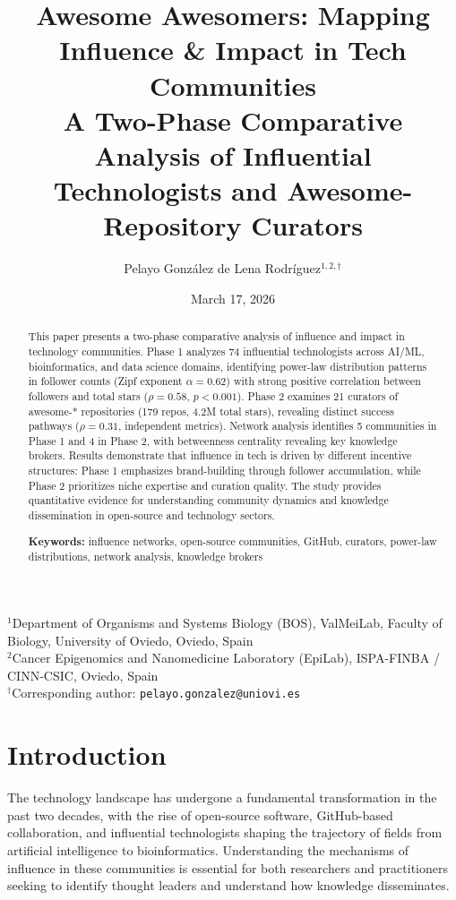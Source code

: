 \documentclass[11pt]{article}
\title{Awesome Awesomers: Mapping Influence \& Impact in Tech Communities\\
{\large A Two-Phase Comparative Analysis of Influential Technologists and Awesome-Repository Curators}}
\author{
    Pelayo González de Lena Rodríguez$^{1,2,\dagger}$
}
\date{March 17, 2026}
\makeatletter
\newcommand{\affiliations}{%
    $^{1}$Department of Organisms and Systems Biology (BOS), ValMeiLab, Faculty of Biology, University of Oviedo, Oviedo, Spain\\
    $^{2}$Cancer Epigenomics and Nanomedicine Laboratory (EpiLab), ISPA-FINBA / CINN-CSIC, Oviedo, Spain\\
    $^{\dagger}$Corresponding author: \texttt{pelayo.gonzalez@uniovi.es}
}
\makeatother
\begin{document}
\maketitle

\vspace{0.5cm}
\begin{center}
\small
\affiliations
\end{center}

\vspace{1cm}

\begin{abstract}
This paper presents a two-phase comparative analysis of influence and impact in technology communities. Phase 1 analyzes 74 influential technologists across AI/ML, bioinformatics, and data science domains, identifying power-law distribution patterns in follower counts (Zipf exponent $\alpha = 0.62$) with strong positive correlation between followers and total stars ($\rho = 0.58$, $p < 0.001$). Phase 2 examines 21 curators of awesome-* repositories (179 repos, 4.2M total stars), revealing distinct success pathways ($\rho = 0.31$, independent metrics). Network analysis identifies 5 communities in Phase 1 and 4 in Phase 2, with betweenness centrality revealing key knowledge brokers. Results demonstrate that influence in tech is driven by different incentive structures: Phase 1 emphasizes brand-building through follower accumulation, while Phase 2 prioritizes niche expertise and curation quality. The study provides quantitative evidence for understanding community dynamics and knowledge dissemination in open-source and technology sectors.

\vspace{0.5cm}
\noindent
\textbf{Keywords:} influence networks, open-source communities, GitHub, curators, power-law distributions, network analysis, knowledge brokers

\end{abstract}

\newpage
\tableofcontents
\newpage


\section{Introduction}

The technology landscape has undergone a fundamental transformation in the past two decades, with the rise of open-source software, GitHub-based collaboration, and influential technologists shaping the trajectory of fields from artificial intelligence to bioinformatics. Understanding the mechanisms of influence in these communities is essential for both researchers and practitioners seeking to identify thought leaders and understand how knowledge disseminates.
\end{document}

